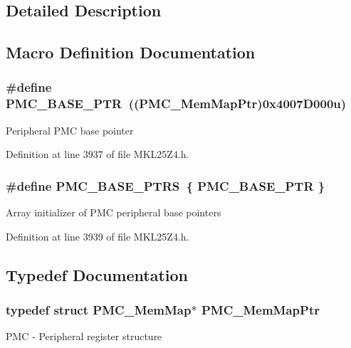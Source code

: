 \subsection{Detailed Description}


\subsection{Macro Definition Documentation}
\subsubsection[{\texorpdfstring{P\+M\+C\+\_\+\+B\+A\+S\+E\+\_\+\+P\+TR}{PMC_BASE_PTR}}]{\setlength{\rightskip}{0pt plus 5cm}\#define P\+M\+C\+\_\+\+B\+A\+S\+E\+\_\+\+P\+TR~(({\bf P\+M\+C\+\_\+\+Mem\+Map\+Ptr})0x4007\+D000u)}\hypertarget{group___p_m_c___peripheral_gaf32df9f1096263f10a5e8978a338b2ac}{}\label{group___p_m_c___peripheral_gaf32df9f1096263f10a5e8978a338b2ac}
Peripheral P\+MC base pointer 

Definition at line 3937 of file M\+K\+L25\+Z4.\+h.

\subsubsection[{\texorpdfstring{P\+M\+C\+\_\+\+B\+A\+S\+E\+\_\+\+P\+T\+RS}{PMC_BASE_PTRS}}]{\setlength{\rightskip}{0pt plus 5cm}\#define P\+M\+C\+\_\+\+B\+A\+S\+E\+\_\+\+P\+T\+RS~\{ {\bf P\+M\+C\+\_\+\+B\+A\+S\+E\+\_\+\+P\+TR} \}}\hypertarget{group___p_m_c___peripheral_ga4bcd62643d597f7230f9c1e3d03caaa7}{}\label{group___p_m_c___peripheral_ga4bcd62643d597f7230f9c1e3d03caaa7}
Array initializer of P\+MC peripheral base pointers 

Definition at line 3939 of file M\+K\+L25\+Z4.\+h.



\subsection{Typedef Documentation}
\subsubsection[{\texorpdfstring{P\+M\+C\+\_\+\+Mem\+Map\+Ptr}{PMC_MemMapPtr}}]{\setlength{\rightskip}{0pt plus 5cm}typedef struct {\bf P\+M\+C\+\_\+\+Mem\+Map}$\ast$ {\bf P\+M\+C\+\_\+\+Mem\+Map\+Ptr}}\hypertarget{group___p_m_c___peripheral_ga0e73f22a2fa26cbb012851719e34812e}{}\label{group___p_m_c___peripheral_ga0e73f22a2fa26cbb012851719e34812e}
P\+MC -\/ Peripheral register structure 